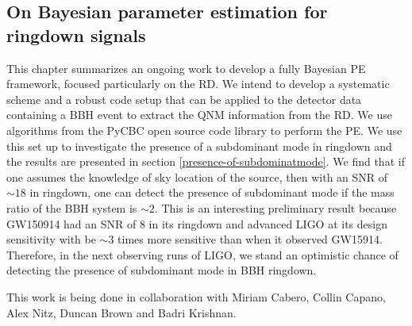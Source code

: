 \subsection{On Bayesian parameter estimation for ringdown signals}
This chapter summarizes an ongoing work to develop a fully Bayesian PE framework, focused particularly on the RD. We intend to develop a systematic scheme and a robust code setup that can be applied to the detector data containing a BBH event to extract the QNM information from the RD. We use algorithms from the PyCBC \cite{Canton:2014ena,Usman:2015kfa,Nitz:2017svb} open source code library to perform the PE.  We use this set up to investigate the presence of a subdominant mode in ringdown and the results are presented in section \ref{presence-of-subdominatmode}. We find that if one assumes the knowledge of sky location of the source, then with an SNR of $\sim 18$ in ringdown, one can detect the presence of subdominant mode if the mass ratio of the BBH system is $\sim 2$. This is an interesting preliminary result because GW150914 had an SNR of 8 in its ringdown and advanced LIGO at its design sensitivity with be $\sim 3$ times more sensitive than when it observed GW15914. Therefore, in the next observing runs of LIGO, we stand an optimistic chance of detecting the presence of subdominant mode in BBH ringdown. 

This work is being done in collaboration with Miriam Cabero, Collin Capano, Alex Nitz, Duncan Brown and Badri Krishnan.  





